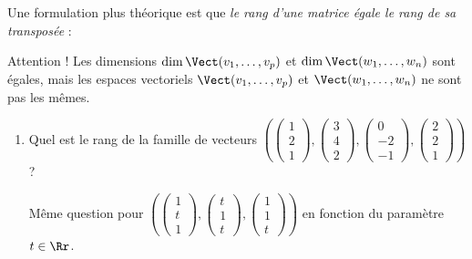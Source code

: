 \documentclass[class=report,crop=false]{standalone}
\begin{document}
Une formulation plus théorique est que \emph{le rang d'une matrice égale le rang de sa transposée} :

Attention ! Les dimensions $\dim \Vect (v_1,\ldots,v_p)$ et $\dim \Vect (w_1,\ldots,w_n)$
sont égales, mais les espaces vectoriels $\Vect (v_1,\ldots,v_p)$ et $\Vect (w_1,\ldots,w_n)$
ne sont pas les mêmes.




\begin{miniexercices}
\sauteligne
\begin{enumerate}

  \item Quel est le rang de la famille de vecteurs
  $\left(
  \left(\begin{smallmatrix} 1\\2\\1 \end{smallmatrix}\right),
  \left(\begin{smallmatrix} 3\\4\\2 \end{smallmatrix}\right),
  \left(\begin{smallmatrix} 0\\-2\\-1 \end{smallmatrix}\right),
  \left(\begin{smallmatrix} 2\\2\\1 \end{smallmatrix}\right)
  \right)$ ?

  Même question pour
  $\left(
  \left(\begin{smallmatrix} 1\\t\\1 \end{smallmatrix}\right),
  \left(\begin{smallmatrix} t\\1\\t \end{smallmatrix}\right),
  \left(\begin{smallmatrix} 1\\1\\t \end{smallmatrix}\right)
  \right)$
  en fonction du paramètre $t\in \Rr$.


\end{enumerate}
\end{miniexercices}
\end{document}
